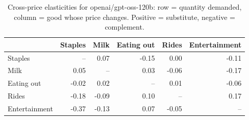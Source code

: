 \begin{table}[!htbp]\centering\small
\caption{Cross-price elasticities for openai/gpt-oss-120b: row = quantity demanded, column = good whose price changes. Positive = substitute, negative = complement.}\label{tab:cross_price_openai_gpt_oss_120b}
\begin{tabular}{lrrrrr}
\hline
 & Staples & Milk & Eating out & Rides & Entertainment \\ \hline
Staples & -- & 0.07 & -0.15 & 0.00 & -0.11 \\
Milk & 0.05 & -- & 0.03 & -0.06 & -0.17 \\
Eating out & -0.02 & 0.02 & -- & 0.01 & -0.06 \\
Rides & -0.18 & -0.09 & 0.10 & -- & 0.17 \\
Entertainment & -0.37 & -0.13 & 0.07 & -0.05 & -- \\
\hline
\end{tabular}
\end{table}